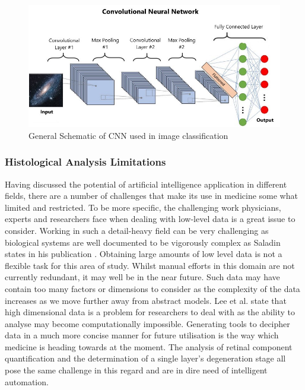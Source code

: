 \documentclass[a4paper]{article}
\begin{document}
        \begin{figure}[h!]
            \centerline{\includegraphics[width=1\textwidth]{../img/cnnModel.jpeg}}
            \label{fig 6: General Schematic of CNN used in image classification} 
            \caption{\label{fig 6:} General Schematic of CNN used in image classification}
        \end{figure}

        \subsubsection{Histological Analysis Limitations}
        Having discussed the potential of artificial intelligence application in different fields, there are a number of challenges that make its use in medicine some what limited and restricted. To be more specific, the challenging work physicians, experts and researchers face when dealing with low-level data is a great issue to consider. Working in such a detail-heavy field can be very challenging as biological systems are well documented to be vigorously complex as Saladin states in his publication \cite{RN21}. Obtaining large amounts of low level data is not a flexible task for this area of study. Whilst manual efforts in this domain are not currently redundant, it may well be in the near future. Such data may have contain too many factors or dimensions to consider as the complexity of the data increases as we move further away from abstract models. Lee et al. \cite{RN20} state that high dimensional data is a problem for researchers to deal with as the ability to analyse may become computationally impossible. Generating tools to decipher data in a much more concise manner for future utilisation is the way which medicine is heading towards at the moment. The analysis of retinal component quantification and the determination of a single layer's degeneration stage all pose the same challenge in this regard and are in dire need of intelligent automation.
        \vspace{3mm}
\end{document}
